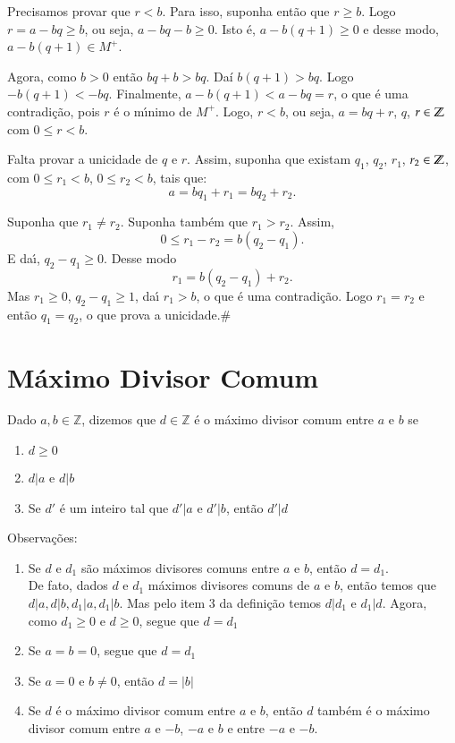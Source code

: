 Precisamos provar que $r < b$. Para isso, suponha ent{\~a}o que $r \geq b$. Logo $r = a-bq \geq b$, ou seja, $a - bq - b\geq 0$. Isto é, $a - b(q+1) \geq 0$ e desse modo, $a - b(q+1) \in M^{+}$.

Agora, como $b > 0$ então $bq + b > bq$. Daí $b(q+1) > bq$. Logo $-b(q+1) < -bq$. Finalmente, $a - b(q + 1) < a - bq = r$, o que {\'e} uma contradi{\c c}{\~a}o, pois $r$ {\'e} o m{\'\i}nimo de $M^+$. Logo, $r < b$, ou seja, $a = bq + r$, $q$, $r \in \mathbb{Z}$ com $0 \leq r < b$.

Falta provar a unicidade de $q$ e $r$. Assim, suponha que existam $q_1$, $q_2$, $r_1$, $r_2 \in \mathbb{Z}$, com $0 \leq r_1 < b$, $0 \leq r_2 < b$, tais que:
\[
	a = bq_1 + r_1 = bq_2 + r_2.
\]

Suponha que $r_1 \ne r_2$. Suponha tamb{\'e}m que $r_1 > r_2$. Assim,
\[
	0 \leq r_1 - r_2 = b(q_2 - q_1).
\]
E da{\'\i}, $q_2 - q_1 \geq 0$.
Desse modo
\[
	r_1 = b(q_2 - q_1) + r_2.
\]
Mas $r_1 \geq 0$, $q_2 - q_1 \geq 1$, da{\'\i} $r_1 > b$, o que {\'e} uma contradi{\c c}{\~a}o. Logo $r_1 = r_2$ e ent{\~a}o $q_1 = q_2$, o que prova a unicidade.\#

\section{M{\'a}ximo Divisor Comum}

\begin{definicao} Dado $a,b\in\mathbb{Z}$, dizemos que $d\in\mathbb{Z}$ {\'e} o m{\'a}ximo divisor comum entre $a$ e $b$ se
\begin{enumerate}
\item $d\geq 0$
\item $d|a$ e $d|b$
\item Se $d'$ {\'e} um inteiro tal que $d'|a$ e $d'|b$, ent{\~a}o $d'|d$ %
\end{enumerate}
\end{definicao}

Observa{\c c}{\~o}es:
\begin{enumerate}
\item Se $d$ e $d_{1}$ s{\~a}o m{\'a}ximos divisores comuns entre $a$ e $b$, ent{\~a}o $d=d_{1}$.\\

De fato, dados $d$ e $d_{1}$ m{\'a}ximos divisores comuns de $a$ e $b$, ent{\~a}o temos que $d|a,d|b,d_{1}|a,d_{1}|b$. Mas pelo item 3 da defini{\c c}{\~a}o temos $d|d_{1}$ e $d_{1}|d$. Agora, como $d_{1}\geq 0$ e $d\geq 0$, segue que $d=d_{1}$
\item Se $a=b=0$, segue que $d=d_{1}$ %
\item Se $a=0$ e $b\neq 0$, ent{\~a}o $d=|b|$
\item Se $d$ {\'e} o m{\'a}ximo divisor comum entre $a$ e $b$, ent{\~a}o $d$ tamb{\'e}m {\'e} o m{\'a}ximo divisor comum entre $a$ e $-b$, $-a$ e $b$ e entre $-a$ e $-b$.
\end{enumerate}

